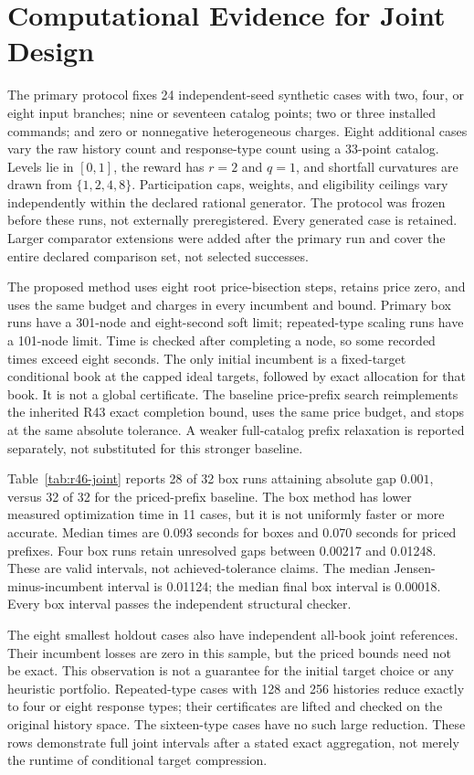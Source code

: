 \section{Computational Evidence for Joint Design}\label{sec:r46-study}
The primary protocol fixes 24 independent-seed synthetic cases with two, four, or eight input branches; nine or seventeen catalog points; two or three installed commands; and zero or nonnegative heterogeneous charges. Eight additional cases vary the raw history count and response-type count using a 33-point catalog. Levels lie in $[0,1]$, the reward has $r=2$ and $q=1$, and shortfall curvatures are drawn from $\{1,2,4,8\}$. Participation caps, weights, and eligibility ceilings vary independently within the declared rational generator. The protocol was frozen before these runs, not externally preregistered. Every generated case is retained. Larger comparator extensions were added after the primary run and cover the entire declared comparison set, not selected successes.

The proposed method uses eight root price-bisection steps, retains price zero, and uses the same budget and charges in every incumbent and bound. Primary box runs have a 301-node and eight-second soft limit; repeated-type scaling runs have a 101-node limit. Time is checked after completing a node, so some recorded times exceed eight seconds. The only initial incumbent is a fixed-target conditional book at the capped ideal targets, followed by exact allocation for that book. It is not a global certificate. The baseline price-prefix search reimplements the inherited R43 exact completion bound, uses the same price budget, and stops at the same absolute tolerance. A weaker full-catalog prefix relaxation is reported separately, not substituted for this stronger baseline.

Table~\ref{tab:r46-joint} reports 28 of 32 box runs attaining absolute gap $0.001$, versus 32 of 32 for the priced-prefix baseline. The box method has lower measured optimization time in 11 cases, but it is not uniformly faster or more accurate. Median times are 0.093 seconds for boxes and 0.070 seconds for priced prefixes. Four box runs retain unresolved gaps between 0.00217 and 0.01248. These are valid intervals, not achieved-tolerance claims. The median Jensen-minus-incumbent interval is 0.01124; the median final box interval is 0.00018. Every box interval passes the independent structural checker.

The eight smallest holdout cases also have independent all-book joint references. Their incumbent losses are zero in this sample, but the priced bounds need not be exact. This observation is not a guarantee for the initial target choice or any heuristic portfolio. Repeated-type cases with 128 and 256 histories reduce exactly to four or eight response types; their certificates are lifted and checked on the original history space. The sixteen-type cases have no such large reduction. These rows demonstrate full joint intervals after a stated exact aggregation, not merely the runtime of conditional target compression.

